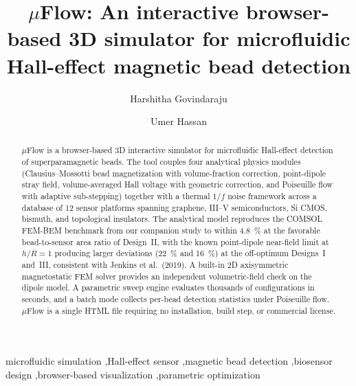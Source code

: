 \documentclass[preprint,12pt,a4paper]{elsarticle}
\begin{document}
\renewcommand{\labelenumii}{\arabic{enumi}.\arabic{enumii}}

\begin{frontmatter}

\title{$\mu$Flow: An interactive browser-based 3D simulator for microfluidic Hall-effect magnetic bead detection}

\author[rutgers]{Harshitha Govindaraju}

\author[rutgers]{Umer Hassan}


\address[rutgers]{Department of Electrical and Computer Engineering, Rutgers, The State University of New Jersey, 94 Brett Road, Piscataway, NJ 08854, USA}

\begin{abstract}
$\mu$Flow is a browser-based 3D interactive simulator for microfluidic Hall-effect detection of superparamagnetic beads. The tool couples four analytical physics modules (Clausius--Mossotti bead magnetization with volume-fraction correction, point-dipole stray field, volume-averaged Hall voltage with geometric correction, and Poiseuille flow with adaptive sub-stepping) together with a thermal $1/f$ noise framework across a database of 12 sensor platforms spanning graphene, III--V semiconductors, Si CMOS, bismuth, and topological insulators. The analytical model reproduces the COMSOL FEM-BEM benchmark from our companion study to within \SI{4.8}{\percent} at the favorable bead-to-sensor area ratio of Design~II, with the known point-dipole near-field limit at $h/R=1$ producing larger deviations (\SI{22}{\percent} and \SI{16}{\percent}) at the off-optimum Designs~I and~III, consistent with Jenkins et al.\ (2019). A built-in 2D axisymmetric magnetostatic FEM solver provides an independent volumetric-field check on the dipole model. A parametric sweep engine evaluates thousands of configurations in seconds, and a batch mode collects per-bead detection statistics under Poiseuille flow. $\mu$Flow is a single HTML file requiring no installation, build step, or commercial license.
\end{abstract}

\begin{keyword}
microfluidic simulation \sep Hall-effect sensor \sep magnetic bead detection \sep biosensor design \sep browser-based visualization \sep parametric optimization
\end{keyword}

\end{frontmatter}
\end{document}
